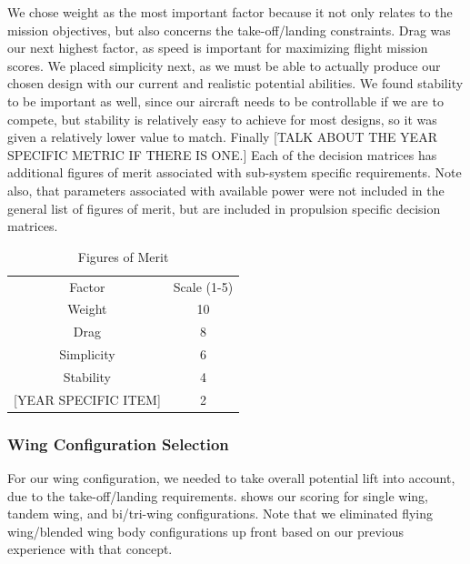 \documentclass[report]{byu-aero}
\begin{document}
We chose weight as the most important factor because it not only relates to the mission objectives, but also concerns the take-off/landing constraints.  Drag was our next highest factor, as speed is important for maximizing flight mission scores.  We placed simplicity next, as we must be able to actually produce our chosen design with our current and realistic potential abilities.  We found stability to be important as well, since our aircraft needs to be controllable if we are to compete, but stability is relatively easy to achieve for most designs, so it was given a relatively lower value to match.  Finally {\color{\BYUred}[TALK ABOUT THE YEAR SPECIFIC METRIC IF THERE IS ONE.]} Each of the decision matrices has additional figures of merit associated with sub-system specific requirements. Note also, that parameters associated with available power were not included in the general list of figures of merit, but are included in propulsion specific decision matrices.

\begin{table}[h!]
	\centering
	\caption{Figures of Merit}
	\label{tab:fom}
	\begin{tabular}{ c c } 

		\rowcolor{BYUbluemid}
		Factor & Scale (1-5) \\

		Weight & 10 \\

		Drag & 8 \\

		Simplicity & 6 \\

		Stability & 4 \\

		{\color{\BYUred} {\color{BYUred} [YEAR SPECIFIC ITEM]}} & 2 \\

	\end{tabular}
\end{table}


\subsubsection{Wing Configuration Selection}

For our wing configuration, we needed to take overall potential lift into account, due to the take-off/landing requirements.   shows our scoring for single wing, tandem wing, and bi/tri-wing configurations.  Note that we eliminated flying wing/blended wing body configurations up front based on our previous experience with that concept.
\end{document}
